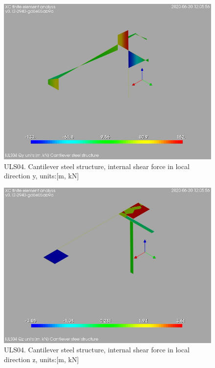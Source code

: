 \begin{figure}
\begin{center}
\includegraphics[width=\linewidth]{ramp_wall/resLC/text/graphics/resSimplLC/lULS04steelMembersQy}
\caption{ULS04. Cantilever steel structure, internal shear force in local direction y, units:[m, kN]}
\end{center}
\end{figure}
\begin{figure}
\begin{center}
\includegraphics[width=\linewidth]{ramp_wall/resLC/text/graphics/resSimplLC/lULS04steelMembersQz}
\caption{ULS04. Cantilever steel structure, internal shear force in local direction z, units:[m, kN]}
\end{center}
\end{figure}
